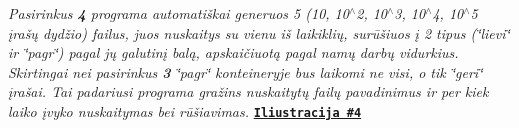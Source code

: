 {\itshape Pasirinkus {\bfseries 4} programa automatiškai generuos 5 (10, 10$^\wedge$2, 10$^\wedge$3, 10$^\wedge$4, 10$^\wedge$5 įrašų dydžio) failus, juos nuskaitys su vienu iš laikiklių, surūšiuos į 2 tipus (\char`\"{}lievi\char`\"{} ir \char`\"{}pagr\char`\"{}) pagal jų galutinį balą, apskaičiuotą pagal namų darbų vidurkius. Skirtingai nei pasirinkus {\bfseries 3} \char`\"{}pagr\char`\"{} konteineryje bus laikomi ne visi, o tik \char`\"{}geri\char`\"{} įrašai. Tai padariusi programa gražins nuskaitytų failų pavadinimus ir per kiek laiko įvyko nuskaitymas bei rūšiavimas.} \href{https://gyazo.com/141621d4d6ed0852214b934ba4f99b6a}{\tt {\bfseries Iliustracija \#4}} 